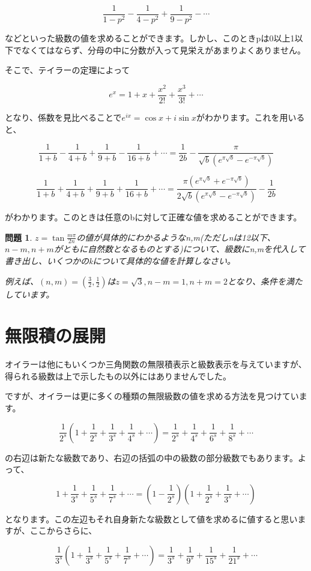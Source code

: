 \documentclass[./main]{subfiles}
\theoremstyle{break}
\newtheorem*{prb}{問題}
\begin{document}
\[\frac{1}{1-p^2}-\frac{1}{4-p^2}+\frac{1}{9-p^2}-\cdots\]

などといった級数の値を求めることができます。しかし、このときpは0以上1以下でなくてはならず、分母の中に分数が入って見栄えがあまりよくありません。

そこで、テイラーの定理によって

\[e^x=1+x+\frac{x^2}{2!}+\frac{x^3}{3!}+\cdots\]

となり、係数を見比べることで$e^{ix}=\cos x+i\sin x$がわかります。これを用いると、

\[\frac{1}{1+b}-\frac{1}{4+b}+\frac{1}{9+b}-\frac{1}{16+b}+\cdots=\frac{1}{2b}-\frac{\pi}{\sqrt{b}(e^{\pi\sqrt{b}}-e^{-\pi\sqrt{b}})}\]

\[\frac{1}{1+b}+\frac{1}{4+b}+\frac{1}{9+b}+\frac{1}{16+b}+\cdots=\frac{\pi(e^{\pi\sqrt{b}}+e^{-\pi\sqrt{b}})}{2\sqrt{b}(e^{\pi\sqrt{b}}-e^{-\pi\sqrt{b}})}-\frac{1}{2b}\]

がわかります。このときは任意のbに対して正確な値を求めることができます。

\begin{prb}
$z=\tan\frac{m\pi}{2n}$の値が具体的にわかるようなn,m(ただしnは12以下、$n-m,n+m$がともに自然数となるものとする)について、級数にn,mを代入して書き出し、いくつかのkについて具体的な値を計算しなさい。

例えば、$(n,m)=(\frac{3}{2},\frac{1}{2})$は$z=\sqrt{3},n-m=1,n+m=2$となり、条件を満たしています。
\end{prb}
\section{無限積の展開}
オイラーは他にもいくつか三角関数の無限積表示と級数表示を与えていますが、得られる級数は上で示したもの以外にはありませんでした。

ですが、オイラーは更に多くの種類の無限級数の値を求める方法を見つけています。

\[\frac{1}{2^s}\left( 1+\frac{1}{2^s}+\frac{1}{3^s}+\frac{1}{4^s}+\cdots \right)=\frac{1}{2^s}+\frac{1}{4^s}+\frac{1}{6^s}+\frac{1}{8^s}+\cdots\]

の右辺は新たな級数であり、右辺の括弧の中の級数の部分級数でもあります。よって、

\[1+\frac{1}{3^s}+\frac{1}{5^s}+\frac{1}{7^s}+\cdots=\left( 1-\frac{1}{2^s} \right)\left( 1+\frac{1}{2^s}+\frac{1}{3^s}+\cdots \right)\]

となります。この左辺もそれ自身新たな級数として値を求めるに値すると思いますが、ここからさらに、

\[\frac{1}{3^s}\left( 1+\frac{1}{3^s}+\frac{1}{5^s}+\frac{1}{7^s}+\cdots \right)=\frac{1}{3^s}+\frac{1}{9^s}+\frac{1}{15^s}+\frac{1}{21^s}+\cdots\]
\end{document}
